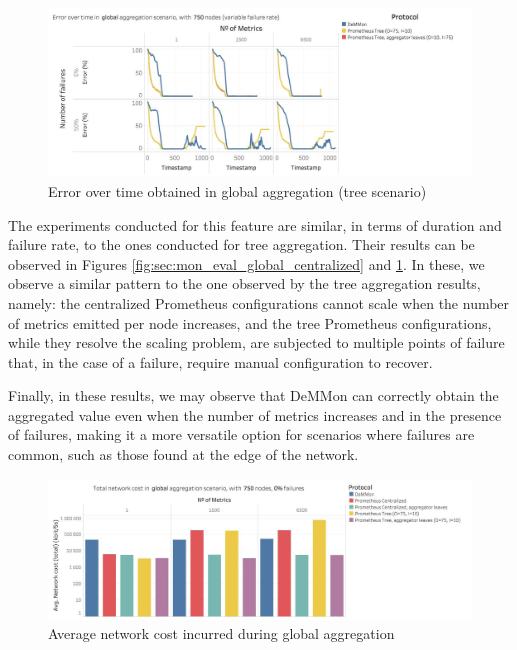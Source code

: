\begin{figure}
    \centering
    \includegraphics[width=\linewidth]{Chapters/evaluation/figures/aggregation/Error_over_time_global_tree.jpg}
    \caption{Error over time obtained in global aggregation (tree scenario)}
    \label{fig:sec:mon_eval_global_tree}
\end{figure}

The experiments conducted for this feature are similar, in terms of duration and failure rate, to the ones conducted for tree aggregation. Their results can be observed in Figures \ref{fig:sec:mon_eval_global_centralized} and \ref{fig:sec:mon_eval_global_tree}. In these, we observe a similar pattern to the one observed by the tree aggregation results, namely: the centralized Prometheus configurations cannot scale when the number of metrics emitted per node increases, and the tree Prometheus configurations, while they resolve the scaling problem, are subjected to multiple points of failure that, in the case of a failure, require manual configuration to recover. 

Finally, in these results, we may observe that DeMMon can correctly obtain the aggregated value even when the number of metrics increases and in the presence of failures, making it a more versatile option for scenarios where failures are common, such as those found at the edge of the network.

\begin{figure}
    \centering
    \includegraphics[width=\linewidth]{Chapters/evaluation/figures/aggregation/network_cost_global.jpg}
    \caption{Average network cost incurred during global aggregation}
    \label{fig:sec:mon_eval_global_net_cost}
\end{figure}

